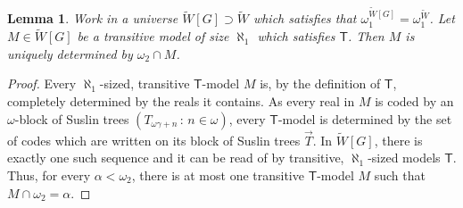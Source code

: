 \documentclass[a4paper,12pt]{article}
\newtheorem{lemma}[theorem]{Lemma}
\newcommand{\T}{\mathsf{T}}
\begin{document}
\begin{lemma}
Work in a universe $\tilde{W}[G] \supset \tilde{W}$ which satisfies that $\omega_1^{\tilde{W}[G]} =\omega_1^{\tilde{W}}$.
Let $M \in \tilde{W}[G]$ be a transitive model of size $\aleph_1$ which satisfies $\T$. Then $M$ is uniquely determined by $\omega_2 \cap M$.
\end{lemma}
\begin{proof}
Every $\aleph_1$-sized, transitive $\T$-model $M$ is, by the definition of $\T$, completely determined by the reals it contains. As every real in $M$ is coded by an $\omega$-block of Suslin trees $(T_{\omega \gamma +n} \, : \, n \in \omega)$, every $\T$-model is determined by the set of codes which are written on its block of Suslin trees $\vec{T}$. In $\tilde{W}[G]$, there is exactly one such sequence and it can be read of by transitive, $\aleph_1$-sized models $\T$. Thus, for every $\alpha < \omega_2$, there is at most one transitive $\T$-model $M$ such that $M \cap \omega_2= \alpha$.
\end{proof}
\end{document}
